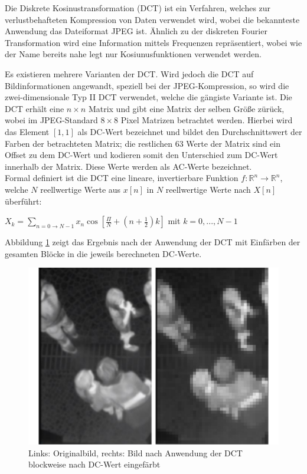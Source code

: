 Die Diskrete Kosinustransformation (DCT)\cite{Khayam03thediscrete} ist ein Verfahren, welches zur verlustbehafteten Kompression von Daten verwendet wird, wobei die bekannteste Anwendung das Dateiformat JPEG ist.
Ähnlich zu der diskreten Fourier Transformation wird eine Information mittels Frequenzen repräsentiert, wobei wie der Name bereits nahe legt nur Kosiunusfunktionen verwendet werden.


Es existieren mehrere Varianten der DCT.
Wird jedoch die DCT auf Bildinformationen angewandt, speziell bei der JPEG-Kompression, so wird die zwei-dimensionale Typ II DCT verwendet, welche die gängiste Variante ist.
Die DCT erhält eine $n \times  n$ Matrix und gibt eine Matrix der selben Größe zürück, wobei im JPEG-Standard $8 \times 8$ Pixel Matrizen betrachtet werden.
Hierbei wird das Element $[1,1]$ als DC-Wert bezeichnet und bildet den Durchschnittswert der Farben der betrachteten Matrix; die restlichen 63 Werte der Matrix sind ein Offset zu dem DC-Wert und kodieren somit den Unterschied zum DC-Wert innerhalb der Matrix.
Diese Werte werden als AC-Werte bezeichnet.\\
Formal definiert ist die DCT eine lineare, invertierbare Funktion $f : \mathbb{R}^n \rightarrow \mathbb{R}^n$, welche $N$ reellwertige Werte aus $x[n]$ in $N$ reellwertige Werte nach $X[n]$ überführt:\\

\begin{centering}
$X_k = \sum\limits_{n=0\rightarrow N-1} x_n \cos [\frac{\Pi}{N} + (n + \frac{1}{2}) k ]$ mit $k = 0,..., N-1$\\
\end{centering}

Abbildung \ref{fig:dct} zeigt das Ergebnis nach der Anwendung der DCT mit Einfärben der gesamten Blöcke in die jeweils berechneten DC-Werte.
\begin{figure}[H]
	\centering
	\includegraphics[width=1\textwidth]{bilder/03_dct_dc-only.pdf}
\caption{Links: Originalbild, rechts: Bild nach Anwendung der DCT blockweise nach DC-Wert eingefärbt}
	\label{fig:dct}
\end{figure}

